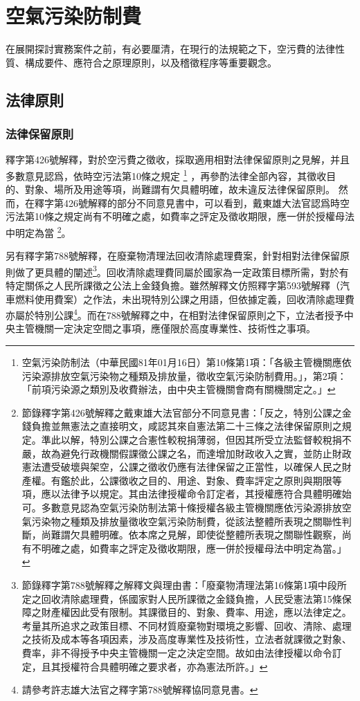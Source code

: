 \section{空氣污染防制費}

在展開探討實務案件之前，有必要厘清，在現行的法規範之下，空污費的法律性質、構成要件、應符合之原理原則，以及稽徵程序等重要觀念。


\subsection{法律原則}

\subsubsection{法律保留原則}

釋字第426號解釋，對於空污費之徵收，採取適用相對法律保留原則之見解，并且多數意見認爲，依時空污法第10條之規定
\footnote{空氣污染防制法（中華民國81年01月16日）第10條第1項：「各級主管機關應依污染源排放空氣污染物之種類及排放量，徵收空氣污染防制費用。」，第2項：「前項污染源之類別及收費辦法，由中央主管機關會商有關機關定之。」}
，再參酌法律全部內容，其徵收目的、對象、場所及用途等項，尚難謂有欠具體明確，故未違反法律保留原則。
然而，在釋字第426號解釋的部分不同意見書中，可以看到，戴東雄大法官認爲時空污法第10條之規定尚有不明確之處，如費率之評定及徵收期限，應一併於授權母法中明定為當
\footnote{節錄釋字第426號解釋之戴東雄大法官部分不同意見書：「反之，特別公課之金錢負擔並無憲法之直接明文，咸認其來自憲法第二十三條之法律保留原則之規定。準此以解，特別公課之合憲性較稅捐薄弱，但因其所受立法監督較稅捐不嚴，故為避免行政機關假課徵公課之名，而達增加財政收入之實，並防止財政憲法遭受破壞與架空，公課之徵收仍應有法律保留之正當性，以確保人民之財產權。有鑑於此，公課徵收之目的、用途、對象、費率評定之原則與期限等項，應以法律予以規定。其由法律授權命令訂定者，其授權應符合具體明確始可。多數意見認為空氣污染防制法第十條授權各級主管機關應依污染源排放空氣污染物之種類及排放量徵收空氣污染防制費，從該法整體所表現之關聯性判斷，尚難謂欠具體明確。依本席之見解，即使從整體所表現之關聯性觀察，尚有不明確之處，如費率之評定及徵收期限，應一併於授權母法中明定為當。」}。



另有釋字第788號解釋，在廢棄物清理法回收清除處理費案，針對相對法律保留原則做了更具體的闡述\footnote{節錄釋字第788號解釋之解釋文與理由書：「廢棄物清理法第16條第1項中段所定之回收清除處理費，係國家對人民所課徵之金錢負擔，人民受憲法第15條保障之財產權因此受有限制。其課徵目的、對象、費率、用途，應以法律定之。考量其所追求之政策目標、不同材質廢棄物對環境之影響、回收、清除、處理之技術及成本等各項因素，涉及高度專業性及技術性，立法者就課徵之對象、費率，非不得授予中央主管機關一定之決定空間。故如由法律授權以命令訂定，且其授權符合具體明確之要求者，亦為憲法所許。」}。回收清除處理費同屬於國家為一定政策目標所需，對於有特定關係之人民所課徵之公法上金錢負擔。雖然解釋文仿照釋字第593號解釋（汽車燃料使用費案）之作法，未出現特別公課之用語，但依據定義，回收清除處理費亦屬於特別公課\footnote{請參考許志雄大法官之釋字第788號解釋協同意見書。}。而在788號解釋之中，在相對法律保留原則之下，立法者授予中央主管機關一定決定空間之事項，應僅限於高度專業性、技術性之事項。

